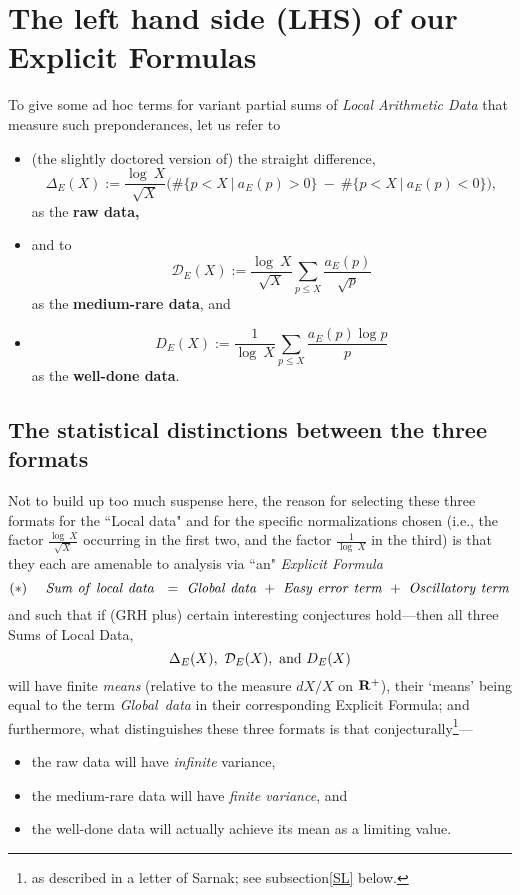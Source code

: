 \documentclass[11pt]{article}
\theoremstyle{plain}
\theoremstyle{definition}
\numberwithin{equation}{section}
\numberwithin{figure}{section}
\numberwithin{table}{section}
\begin{document}
 \section{ The left hand side (LHS) of our Explicit Formulas}
  To give some ad hoc terms for variant partial sums of {\it Local Arithmetic Data} that measure such preponderances,  let us refer to\begin{itemize}\item   (the slightly doctored version of) the straight difference,
 $${\Delta}_E(X):=  {\frac{\log\ X}{\sqrt X}}\big(\#\{ p < X\ | \ a_E(p) > 0\}\ - \ \#\{ p < X\ | \  a_E(p) < 0\}\big),$$  as  the {\bf raw data,} \item and to
 $${\mathcal D}_E(X):= {\frac{\log\ X}{\sqrt X}}\sum_{p \le X}{\frac{a_E(p)}{\sqrt p}}$$ as the {\bf medium-rare data}, and \item
  $${D}_E(X):= {\frac{1}{\log\ X}}\sum_{p \le X}{\frac{a_E(p)\log p}{ p}}$$  as the {\bf well-done data}.
  \end{itemize}
 \subsection{The statistical distinctions between the three formats}\label{statdist}
   Not to build up too much suspense here, the reason for selecting these three formats for the ``Local data"  and for the specific normalizations chosen (i.e., the factor $ {\frac{\log\ X}{\sqrt X}}$ occurring in the first two, and the factor  ${\frac{1}{\log\ X}}$ in the third)  is that they each are amenable to analysis via ``an" {\it Explicit Formula}
   $$(*)\  \  \  \  {\rm{\it Sum\ of\ local\ data\  }}  \ = \  {\rm{\it Global\ data}}\ + \  {\rm{\it  Easy\ error\ term}}\ + \  {\rm{\it  Oscillatory\ term}}$$
 and such that if (GRH plus)  certain interesting conjectures hold---then  all three  Sums of Local Data, $${\Delta}_E(X), \ {\mathcal D}_E(X), \ {\rm and} \ D_E(X)$$ will have finite {\it means}  (relative to the measure $dX/X$ on ${\bf R}^+$), their `means' being equal to the term  {\rm{\it Global\ data}} in their corresponding Explicit Formula;  and furthermore, what distinguishes these three formats is that conjecturally{\footnote{ as described in a letter of Sarnak; see subsection{\ref{SL}} below.}}---
   \begin{itemize}
   \item the raw data will have {\it infinite} variance,
   \item the medium-rare data will have {\it finite variance}, and
   \item the well-done data will actually achieve its mean as a limiting value.
   \end{itemize}
\end{document}
